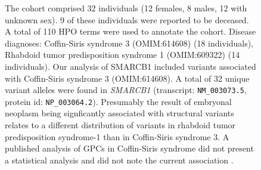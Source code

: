 \begin{figure}[htbp]
\caption{The cohort comprised 32 individuals (12 females, 8 males, 12 with unknown sex). 9 of these individuals were 
reported to be deceased. A total of 110 HPO terms were used to annotate the cohort. Disease diagnoses: 
Coffin-Siris syndrome 3 (OMIM:614608) (18 individuals), Rhabdoid tumor predisposition syndrome 1 (OMIM:609322) 
(14 individuals). Our analysis of SMARCB1 included variants associated with Coffin-Siris syndrome 3 (OMIM:614608).
A total of 32 unique variant alleles were found in \textit{SMARCB1} (transcript: \texttt{NM\_003073.5}, 
protein id: \texttt{NP\_003064.2}). Presumably the result of embryonal neoplasm being signficantly associated with structural variants relates to a 
different distribution of variants in rhabdoid tumor predisposition syndrome-1 than in Coffin-Siris syndrome 3.
A published analysis of GPCs in Coffin-Siris syndrome did not present a statistical analysis and did not note the current association \cite{PMID_25168959}.}
\end{figure}

